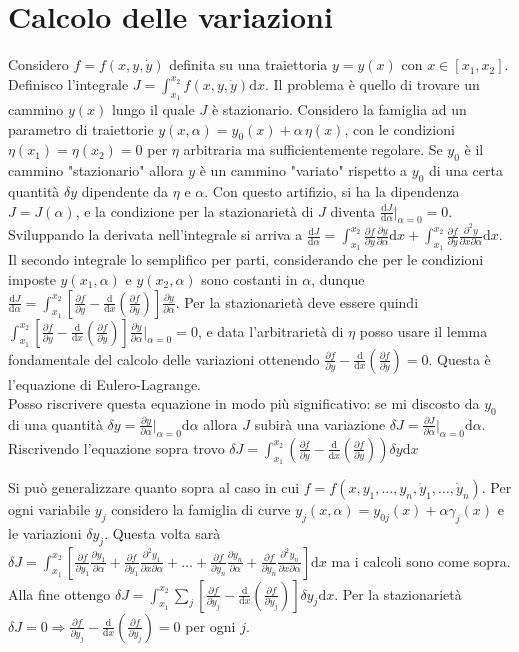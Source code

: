 \documentclass[10pt,a4paper]{article}
\newcommand{\de}{\mathrm d}
\newcommand{\fracd}[2]{\frac{\de #1}{\de #2}}
\newcommand{\fracp}[2]{\frac{\partial #1}{\partial #2}}
\newcommand{\fracpp}[3]{\frac{\partial^2 #1}{\partial #2 \partial #3}}
\begin{document}
	\section{Calcolo delle variazioni}
	Considero $f=f(x,y,\dot y)$ definita su una traiettoria $y=y(x)$ con $x\in[x_1,x_2]$. Definisco l'integrale $J=\int_{x_1}^{x_2}f(x,y,\dot y)\de x$. Il problema è quello di trovare un cammino $y(x)$ lungo il quale $J$ è stazionario. Considero la famiglia ad un parametro di traiettorie $y(x,\alpha)=y_0(x)+\alpha\,\eta(x)$, con le condizioni $\eta(x_1)=\eta(x_2)=0$ per $\eta$ arbitraria ma sufficientemente regolare. Se $y_0$ è il cammino "stazionario" allora $y$ è un cammino "variato" rispetto a $y_0$ di una certa quantità $\delta y$ dipendente da $\eta$ e $\alpha$. Con questo artifizio, si ha la dipendenza $J=J(\alpha)$, e la condizione per la stazionarietà di $J$ diventa $\fracd{J}{\alpha}|_{\alpha=0}=0$. Sviluppando la derivata nell'integrale si arriva a $\fracd{J}{\alpha}=\int_{x_1}^{x_2}\fracp{f}{y}\fracp{y}{\alpha}\de x + \int_{x_1}^{x_2}\fracp{f}{\dot y}\fracpp{y}{x}{\alpha}\de x$. Il secondo integrale lo semplifico per parti, considerando che per le condizioni imposte $y(x_1,\alpha)$ e $y(x_2,\alpha)$ sono costanti in $\alpha$, dunque $\fracd{J}{\alpha}=\int_{x_1}^{x_2}[\fracp{f}{y}-\fracd{}{x}(\fracp{f}{\dot y})]{\fracp{y}{\alpha}}$. Per la stazionarietà deve essere quindi $\int_{x_1}^{x_2}[\fracp{f}{y}-\fracd{}{x}(\fracp{f}{\dot y})]{\fracp{y}{\alpha}}|_{\alpha=0} = 0$, e data l'arbitrarietà di $\eta$ posso usare il lemma fondamentale del calcolo delle variazioni ottenendo $\fracp{f}{y}-\fracd{}{x}(\fracp{f}{\dot y})=0$. Questa è l'equazione di Eulero-Lagrange.\\
	Posso riscrivere questa equazione in modo più significativo: se mi discosto da $y_0$ di una quantità $\delta y=\fracp{y}{\alpha}|_{\alpha=0}\de\alpha$ allora $J$ subirà una variazione $\delta J=\fracp{J}{\alpha}|_{\alpha=0}\de\alpha$. Riscrivendo l'equazione sopra trovo $\delta J=\int_{x_1}^{x_2}(\fracp{f}{y}-\fracd{}{x}(\fracp{f}{\dot y}))\delta y\de x$
	
	Si può generalizzare quanto sopra al caso in cui $f=f(x, y_1, \ldots, y_n, \dot y_1,\ldots,\dot y_n)$. Per ogni variabile $y_j$ considero la famiglia di curve $y_j(x,\alpha)=y_{0j}(x)+\alpha\gamma_j(x)$ e le variazioni $\delta y_j$. Questa volta sarà $\delta J=\int_{x_1}^{x_2}[\fracp{f}{y_1}\fracp{y_1}{\alpha} +\fracp{f}{\dot y_1}\fracpp{y_1}{x}{\alpha}+\ldots+\fracp{f}{y_n}\fracp{y_n}{\alpha} +\fracp{f}{\dot y_n}\fracpp{y_n}{x}{\alpha}]\de x$ ma i calcoli sono come sopra. Alla fine ottengo $\delta J=\int_{x_1}^{x_2}\sum_j[\fracp{f}{y_j}-\fracd{}{x}(\fracp{f}{\dot y_j})]\delta y_j\de x$. Per la stazionarietà $\delta J=0 \Rightarrow \fracp{f}{y_j}-\fracd{}{x}(\fracp{f}{\dot y_j})=0$ per ogni $j$.
	
\end{document}
